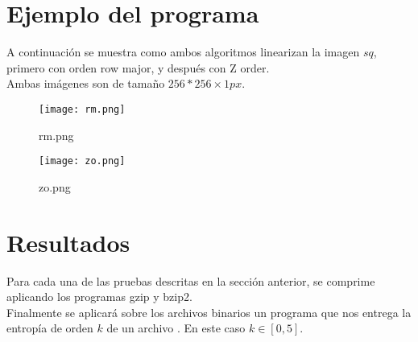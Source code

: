 \documentclass[12pt]{article}
\begin{document}
\section*{Ejemplo del programa}
A continuación se muestra como ambos algoritmos linearizan la imagen $sq$,
primero con orden row major, y después con Z order. \\
Ambas imágenes son de tamaño $256*256 \times 1  px$.
\begin{figure}[h]
	\centering
	\texttt{[image: rm.png]}
	\caption{rm.png}
	\label{fig:rm-png}
\end{figure}

\begin{figure}[h]
	\centering
	\texttt{[image: zo.png]}
	\caption{zo.png}
	\label{fig:zo-png}
\end{figure}

\section*{Resultados}
Para cada una de las pruebas descritas en la sección anterior, se comprime
aplicando los programas gzip y bzip2.\\
Finalmente se aplicará sobre los archivos binarios un programa que
nos entrega la entropía de orden $k$ de un archivo \cite{entrop}. En este caso $k \in [0, 5]$.
\clearpage
\end{document}
